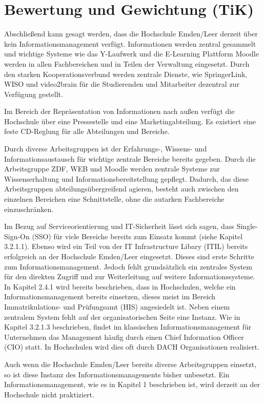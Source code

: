 \section{Bewertung und Gewichtung (TiK)}
Abschließend kann gesagt werden, dass die Hochschule Emden/Leer derzeit über kein Informationsmanagement verfügt. Informationen werden zentral gesammelt und wichtige Systeme wie das Y-Laufwerk und die E-Learning Plattform Moodle werden in allen Fachbereichen und in Teilen der Verwaltung eingesetzt. Durch den starken Kooperationsverbund werden zentrale Dienste, wie SpringerLink, WISO und video2brain für die Studierenden und Mitarbeiter dezentral zur Verfügung gestellt. 

Im Bereich der Repräsentation von Informationen nach außen verfügt die Hochschule über eine Pressestelle und eine Marketingabteilung. Es existiert eine feste CD-Reglung für alle Abteilungen und Bereiche. 

Durch diverse Arbeitsgruppen ist der Erfahrungs-, Wissens- und Informationsaustausch für wichtige zentrale Bereiche bereits gegeben. Durch die Arbeitsgruppe ZDF, WEB und Moodle werden zentrale Systeme zur Wissenserhaltung und Informationsbereitstellung gepflegt. Dadurch, das diese Arbeitsgruppen abteilungsübergreifend agieren, besteht auch zwischen den einzelnen Bereichen eine Schnittstelle, ohne die autarken Fachbereiche einzuschränken. 

Im Bezug auf Serviceorientierung und IT-Sicherheit lässt sich sagen, dass Single-Sign-On (SSO) für viele Bereiche bereits zum Einsatz kommt (siehe Kapitel 3.2.1.1). Ebenso wird ein Teil von der IT Infrastructure Libary (ITIL) bereits erfolgreich an der Hochschule Emden/Leer eingesetzt. Dieses sind erste Schritte zum Informationsmanagement. Jedoch fehlt grundsätzlich ein zentrales System für den direkten Zugriff und zur Weiterleitung auf weitere Informationssysteme. In Kapitel 2.4.1 wird bereits beschrieben, dass in Hochschulen, welche ein Informationsmanagement bereits einsetzen, dieses meist im Bereich Immatrikulations- und Prüfungsamt (HIS) angesiedelt ist. 
Neben einem  zentralem System fehlt auf der organisatorischen Seite eine Instanz. Wie in Kapitel 3.2.1.3 beschrieben, findet im klassischen Informationsmanagement für Unternehmen das Management häufig durch einen Chief Information Officer (CIO) statt. In Hochschulen wird dies oft durch DACH Organisationen realisiert. 

Auch wenn die Hochschule Emden/Leer bereits diverse Arbeitsgruppen einsetzt, so ist diese Instanz des Informationsmanagements bisher unbesetzt. Ein Informationsmanagement, wie es in Kapitel 1 beschrieben ist, wird derzeit an der Hochschule nicht praktiziert.